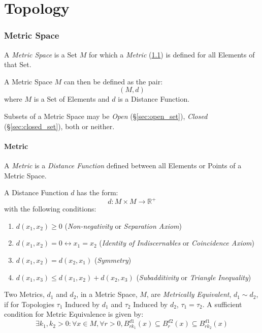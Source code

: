 \part{Topology}\label{part:topology}\cite{lc11}

\section{Metric Space}\label{sec:metric_space}

A \emph{Metric Space} is a Set $M$ for which a \emph{Metric}
(\ref{sec:metric}) is defined for all Elements of that Set.

A Metric Space $M$ can then be defined as the pair:
\[
  (M,d)
\]
where $M$ is a Set of Elements and $d$ is a Distance Function.

Subsets of a Metric Space may be \emph{Open}
(\S\ref{sec:open_set}), \emph{Closed} (\S\ref{sec:closed_set}),
both or neither.



\subsection{Metric}\label{sec:metric}

A \emph{Metric} is a \emph{Distance Function} defined between all
Elements or Points of a Metric Space.

A Distance Function $d$ has the form:
\[
  d: M \times M \rightarrow \mathbb{R}^{+}
\]
with the following conditions:
\begin{enumerate}
\item $d(x_1, x_2) \geq 0$ (\emph{Non-negativity} or \emph{Separation
  Axiom})
\item $d(x_1, x_2) = 0 \leftrightarrow x_1 = x_2$ (\emph{Identity of
  Indiscernables} or \emph{Coincidence Axiom})
\item $d(x_1, x_2) = d(x_2, x_1)$ (\emph{Symmetry})
\item $d(x_1, x_3) \leq d(x_1, x_2) + d(x_2, x_3)$
  (\emph{Subadditivity} or \emph{Triangle Inequality})
\end{enumerate}
Two Metrics, $d_1$ and $d_2$, in a Metric Space, $M$, are
\emph{Metrically Equivalent}, $d_1 \sim d_2$, if for Topologies
$\tau_1$ Induced by $d_1$ and $\tau_2$ Induced by $d_2$, $\tau_1 =
\tau_2$. A sufficient condition for Metric Equivalence is given by:
\[
  \exists k_1, k_2 > 0 : \forall x \in M, \forall r > 0,
  B^{d1}_{rk_1}(x) \subseteq B^{d2}_r (x) \subseteq B^{d1}_{rk_2}(x)
\]

